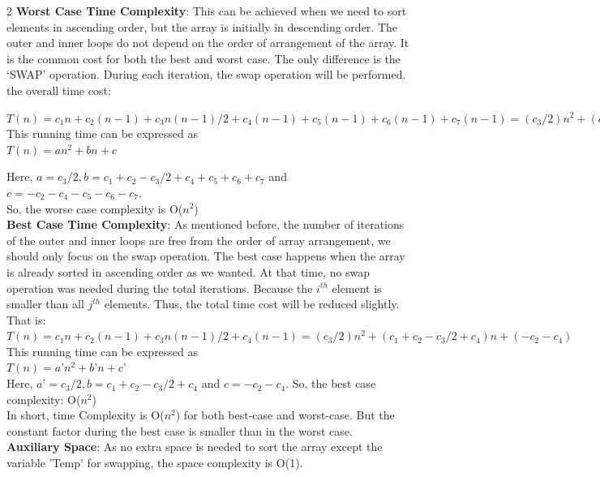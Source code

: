\documentclass[article,10pt]{article}
\begin{document}
\begin{multicols}{2}
\textbf{Worst Case Time Complexity}: This can be achieved when we need to sort elements in ascending order, but the array is initially in descending order. The outer and inner loops do not depend on the order of arrangement of the array. It is the common cost for both the best and worst case. The only difference is the ‘SWAP’ operation. During each iteration, the swap operation will be performed.
the overall time cost:

$T(n) = c_1n + c_2(n-1) + c_3n(n-1) / 2 + c_4(n-1) + c_5(n-1) + c_6(n-1) + c_7(n-1)
= (c_3/2)n^2 + (c_1+c_2-c_3/2+c_4+c_5+c_6+c_7)n + (-c_2-c_4-c_5-c_6-c_7)$\\

This running time can be expressed as\\ $T(n) = an^2 + bn + c$

Here, $a = c_3/2, b = c_1+c_2-c_3/2+c_4+c_5+c_6+c_7$ and $c = -c_2-c_4-c_5-c_6-c_7$.\\
So, the worse case complexity is O($n^2$)\\


\textbf{Best Case Time Complexity}: As mentioned before, the number of iterations of the outer and inner loops are free from the order of array arrangement, we should only focus on the swap operation. The best case happens when the array is already sorted in ascending order as we wanted. At that time, no swap operation was needed during the total iterations. Because the $i^{th}$ element is smaller than all $j^{th}$ elements. Thus, the total time cost will be reduced slightly. That is:\\
$T(n) = c_1n + c_2(n-1) + c_3n(n-1) / 2 + c_4(n-1)
= (c_3/2)n^2 + (c_1+c_2-c_3/2+c_4)n + (-c_2-c_4)$\\
This running time can be expressed as \\
$T(n) = a’n^2 + b’n + c’$\\
Here, $a’ = c_3/2, b = c_1+c_2-c_3/2+c_4$ and $c = -c_2-c_4$.
So, the best case complexity: O($n^2$)\\
In short, time Complexity is O($n^2$) for both best-case and worst-case. But the constant factor during the best case is smaller than in the worst case.\\

\textbf{Auxiliary Space}: As no extra space is needed to sort the array except the variable 'Temp' for swapping, the space complexity is O(1).\\


\end{multicols}
\end{document}
